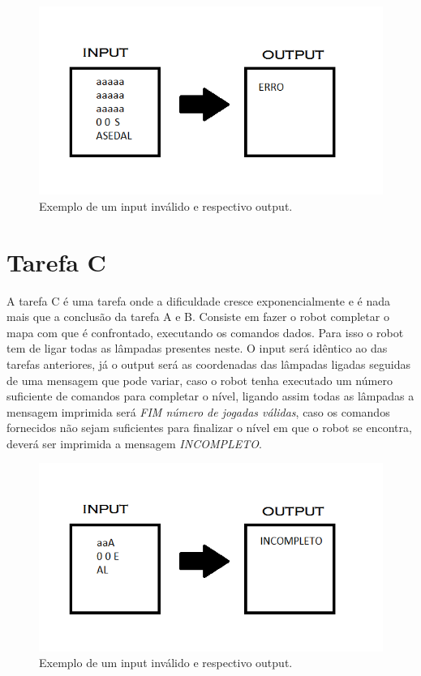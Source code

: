 \documentclass[a4paper,12pt]{report}
\begin{document}
\begin{figure}[!h]
\centering
\includegraphics[scale=0.45]{./RELATORIOEX4.png}
\caption{Exemplo de um input inválido e respectivo output.}
\end{figure}



\section{Tarefa C}
A tarefa C é uma tarefa onde a dificuldade cresce exponencialmente e é nada mais que a conclusão da tarefa A e B. Consiste em fazer o robot completar o mapa com que é confrontado, executando os comandos dados. Para isso o robot tem de ligar todas as lâmpadas presentes neste. O input será idêntico ao das tarefas anteriores, já o output será as coordenadas das lâmpadas ligadas seguidas de uma mensagem que pode variar, caso o robot tenha executado um número suficiente de comandos para completar o nível, ligando assim todas as lâmpadas a mensagem imprimida será \emph{FIM \flq número de jogadas válidas\frq}, caso os comandos fornecidos não sejam suficientes para finalizar o nível em que o robot se encontra, deverá ser imprimida a mensagem \emph{INCOMPLETO}.

\begin{figure}[!h]
\centering
\includegraphics[scale=0.45]{./RELATORIOEX5.png}
\caption{Exemplo de um input inválido e respectivo output.}
\end{figure}
\end{document}

